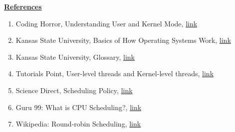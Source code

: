 \documentclass[12pt]{article}
\begin{document}
\bigskip

\underline{\textbf{References}}

\begin{enumerate}[1)]
    \item Coding Horror, Understanding User and Kernel Mode, \href{https://blog.codinghorror.com/understanding-user-and-kernel-mode/}{link}
    \item Kansas State University, Basics of How Operating Systems Work, \href{http://faculty.salina.k-state.edu/tim/ossg/Introduction/OSworking.html#:~:text=Interrupts%20are%20signals%20sent%20to,part%20of%20the%20operating%20system.&text=Hardware%20Interupts%20are%20generated%20by,some%20attention%20from%20the%20OS.}{link}
    \item Kansas State University, Glossary, \href{http://faculty.salina.k-state.edu/tim/ossg/glossary.html#term-context-switch}{link}
    \item Tutorials Point, User-level threads and Kernel-level threads, \href{https://www.tutorialspoint.com/user-level-threads-and-kernel-level-threads}{link}
    \item Science Direct, Scheduling Policy, \href{https://www.sciencedirect.com/topics/computer-science/scheduling-policy#:~:text=Scheduling%20policies%20are%20algorithms%20for,nature%20of%20applications%20%5B1%5D.}{link}
    \item Guru 99: What is CPU Scheduling?, \href{https://www.guru99.com/cpu-scheduling-algorithms.html#8}{link}
    \item Wikipedia: Round-robin Scheduling, \href{https://en.wikipedia.org/wiki/Round-robin_scheduling}{link}
\end{enumerate}
\end{document}
